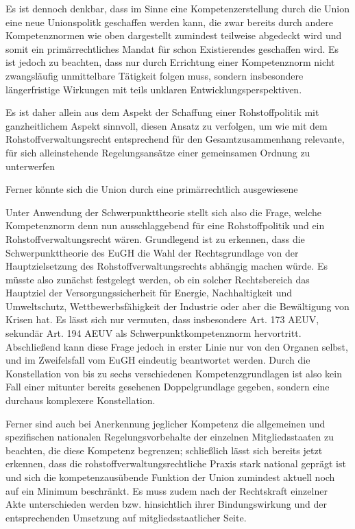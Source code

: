 \documentclass[12pt,a4paper,oneside]{book} %
\begin{document}
	Es ist dennoch denkbar, dass im Sinne eine Kompetenzerstellung durch die Union eine neue Unionspolitk geschaffen werden kann, die zwar bereits durch andere Kompetenznormen wie oben dargestellt zumindest teilweise abgedeckt wird und somit ein primärrechtliches Mandat für schon Existierendes geschaffen wird. Es ist jedoch zu beachten, dass nur durch Errichtung einer Kompetenznorm nicht zwangsläufig unmittelbare Tätigkeit folgen muss, sondern insbesondere längerfristige Wirkungen mit teils unklaren Entwicklungsperspektiven.\autocite[siehe hierzu Nettesheim Art. 194 En 40]{grabitz_recht_2024}
	
	Es ist daher allein aus dem Aspekt der Schaffung einer Rohstoffpolitik mit ganzheitlichem Aspekt sinnvoll, diesen Ansatz zu verfolgen, um wie mit dem Rohstoffverwaltungsrecht entsprechend für den Gesamtzusammenhang relevante, für sich alleinstehende Regelungsansätze einer gemeinsamen Ordnung zu unterwerfen
	
	Ferner könnte sich die Union durch eine primärrechtlich ausgewiesene
	
	Unter Anwendung der Schwerpunkttheorie stellt sich also die Frage, welche Kompetenznorm denn nun ausschlaggebend für eine Rohstoffpolitik und ein Rohstoffverwaltungsrecht wären. Grundlegend ist zu erkennen, dass die Schwerpunkttheorie des EuGH die Wahl der Rechtsgrundlage von der Hauptzielsetzung des Rohstoffverwaltungsrechts abhängig machen würde. Es müsste also zunächst festgelegt werden, ob ein solcher Rechtsbereich das Hauptziel der Versorgungssicherheit für Energie, Nachhaltigkeit und Umweltschutz, Wettbewerbsfähigkeit der Industrie oder aber die Bewältigung von Krisen hat. Es lässt sich nur vermuten, dass insbesondere Art. 173 AEUV, sekundär Art. 194 AEUV als Schwerpunktkompetenznorm hervortritt. Abschließend kann diese Frage jedoch in erster Linie nur von den Organen selbst, und im Zweifelsfall vom EuGH eindeutig beantwortet werden. Durch die Konstellation von bis zu sechs verschiedenen Kompetenzgrundlagen ist also kein Fall einer mitunter bereits gesehenen Doppelgrundlage gegeben, sondern eine durchaus komplexere Konstellation. 
	
	Ferner sind auch bei Anerkennung jeglicher Kompetenz die allgemeinen und spezifischen nationalen Regelungsvorbehalte der einzelnen Mitgliedsstaaten zu beachten, die diese Kompetenz begrenzen; schließlich lässt sich bereits jetzt erkennen, dass die rohstoffverwaltungsrechtliche Praxis stark national geprägt ist und sich die kompetenzausübende Funktion der Union zumindest aktuell noch auf ein Minimum beschränkt. Es muss zudem nach der Rechtskraft einzelner Akte unterschieden werden bzw. hinsichtlich ihrer Bindungswirkung und der entsprechenden Umsetzung auf mitgliedsstaatlicher Seite.
	
\end{document}
